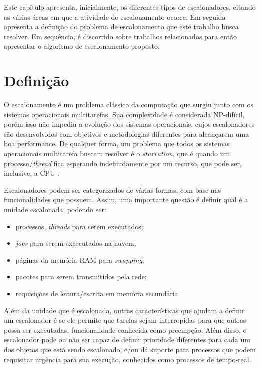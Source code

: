 Este capítulo apresenta, inicialmente, os diferentes tipos de escalonadores, citando as várias áreas em que a atividade de escalonamento ocorre. Em seguida apresenta a definição do problema de escalonamento que este trabalho busca resolver. Em sequência, é discorrido sobre trabalhos relacionados para então apresentar o algoritmo de escalonamento proposto.

\section{Definição}

O escalonamento é um problema clássico da computação que surgiu junto com os sistemas operacionais multitarefas. Sua complexidade é considerada NP-difícil\cite{ULLMAN1975384}, porém isso não impediu a evolução dos sistemas operacionais, cujos escalonadores são desenvolvidos com objetivos e metodologias diferentes para alcançarem uma boa performance. De qualquer forma, um problema que todos os sistemas operacionais multitarefa buscam resolver é o \textit{starvation}, que é quando um processo/\textit{thread} fica esperando indefinidamente por um recurso, que pode ser, inclusive, a \acrshort{CPU} \cite{TANEMBAUM_SO}.

Escalonadores podem ser categorizados de várias formas, com base nas funcionalidades que possuem. Assim, uma importante questão é definir qual é a unidade escalonada, podendo ser\cite{TANEMBAUM_SO}:

	\begin{itemize}
		\item processos, \textit{threads} para serem executados;
		\item \textit{jobs} para serem excecutados na nuvem;
		\item páginas da memória \acrfull{RAM} para \textit{swapping};
		\item pacotes para serem transmitidos pela rede;
		\item requisições de leitura/escrita em memória secundária.
	\end{itemize}

	Além da unidade que é escalonada, outras características que ajudam a definir um escalonador é se ele permite que tarefas sejam interropidas para que outras possa ser executadas, funcionalidade conhecida como preempção. Além disso, o escalonador pode ou não ser capaz de definir prioridade diferentes para cada um dos objetos que está sendo escalonado, e/ou dá suporte para processos que podem requisitar urgência para sua execução, conhecidos como processos de tempo-real\cite{TANEMBAUM_SO}.

